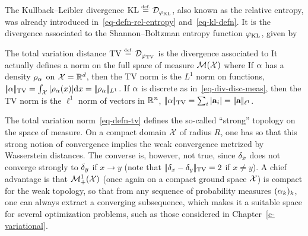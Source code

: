 \begin{example}
\label{ex_KLdiv}
The Kullback--Leibler divergence $\operatorname{KL} \stackrel{\mbox{\upshape\tiny def.}}{=} \mathcal{D}_{\varphi_{\operatorname{KL}}}$, also known as the relative entropy, was already introduced in~\eqref{eq-defn-rel-entropy} and~\eqref{eq-kl-defn}. It is the divergence associated to the Shannon--Boltzman entropy function $\varphi_{\operatorname{KL}}$, given by
\end{example}


\begin{example}\label{exmp-tv}
The total variation distance $\operatorname{TV} \stackrel{\mbox{\upshape\tiny def.}}{=} \mathcal{D}_{\varphi_{\operatorname{TV}}}$ is the divergence associated to
It actually defines a norm on the full space of measure $\mathcal{M}(\mathcal{X})$ where
If $\alpha$ has a density $\rho_{\alpha}$ on $\mathcal{X}=\mathbb{R}^d$, then the TV norm is the $L^1$ norm on functions, $|\!| \alpha |\!|_{\operatorname{TV}} = \int_{\mathcal{X}} |\rho_{\alpha}(x)| \mathrm{d} x = |\!| \rho_{\alpha} |\!|_{L^1}$.
%
If $\alpha$ is discrete as in~\eqref{eq-div-disc-meas}, then the TV norm is the $\ell^1$ norm of vectors in $\mathbb{R}^n$, $|\!| \alpha |\!|_{\operatorname{TV}}=\sum_i |\mathrm{\textbf{\upshape a}}_i| = |\!| \mathrm{\textbf{\upshape a}} |\!|_{\ell^1}$.
\end{example}

\begin{rem}
	The total variation norm~\eqref{eq-defn-tv} defines the so-called ``strong'' topology on the space of measure. 
	On a compact domain $\mathcal{X}$ of radius $R$, one has 
	so that this strong notion of convergence implies the weak convergence metrized by Wasserstein distances. 
	The converse is, however, not true, since $\delta_x$ does not converge strongly to $\delta_y$ if $x \rightarrow y$ (note that
	$|\!| \delta_x-\delta_y |\!|_{\operatorname{TV}}=2$ if $x \neq y$). 
	A chief advantage is that $\mathcal{M}_+^1(\mathcal{X})$ (once again on a compact ground space $\mathcal{X}$) is compact for the weak topology, so that from any sequence of probability measures $(\alpha_k)_k$, one can always extract a converging subsequence, which makes it a suitable space for several optimization problems, such as those considered in Chapter~\ref{c-variational}.
\end{rem}

